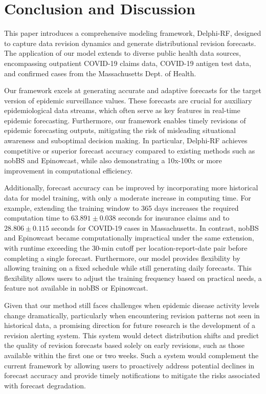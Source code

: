 \section{Conclusion and Discussion}
This paper introduces a comprehensive modeling framework, Delphi-RF, designed to capture data revision dynamics and generate distributional revision forecasts. The application of our model extends to diverse public health data sources, encompassing outpatient COVID-19 claims data, COVID-19 antigen test data, and confirmed cases from the Massachusetts Dept. of Health.

Our framework excels at generating accurate and adaptive forecasts for the target version of epidemic surveillance values. These forecasts are crucial for auxiliary epidemiological data streams, which often serve as key features in real-time epidemic forecasting. Furthermore, our framework enables timely revisions of epidemic forecasting outputs, mitigating the risk of misleading situational awareness and suboptimal decision making. In particular, Delphi-RF achieves competitive or superior forecast accuracy compared to existing methods such as nobBS and Epinowcast, while also demonstrating a 10x-100x or more improvement in computational efficiency.

Additionally, forecast accuracy can be improved by incorporating more historical data for model training, with only a moderate increase in computing time. For example, extending the training window to 365 days increases the required computation time to $63.891 \pm 0.038$ seconds for insurance claims and to $28.806 \pm 0.115$ seconds for COVID-19 cases in Massachusetts. In contrast, nobBS and Epinowcast became computationally impractical under the same extension, with runtime exceeding the 30-min cutoff per location-report-date pair before completing a single forecast. Furthermore, our model provides flexibility by allowing training on a fixed schedule while still generating daily forecasts. This flexibility allows users to adjust the training frequency based on practical needs, a feature not available in nobBS or Epinowcast.

Given that our method still faces challenges when epidemic disease activity levels change dramatically, particularly when encountering revision patterns not seen in historical data, a promising direction for future research is the development of a revision alerting system. This system would detect distribution shifts and predict the quality of revision forecasts based solely on early revisions, such as those available within the first one or two weeks. Such a system would complement the current framework by allowing users to proactively address potential declines in forecast accuracy and provide timely notifications to mitigate the risks associated with forecast degradation.


